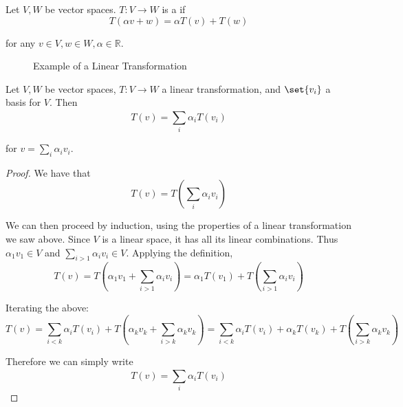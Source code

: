 \documentclass{article}
\begin{document}
\begin{definition}
  Let $V, W$ be vector spaces. $T: V \to W$ is a  if
  \[
    T(\alpha v + w) = \alpha T(v) + T(w)
  \]

  for any $v \in V, w \in W, \alpha \in \mathbb{R}$.
\end{definition}

\begin{figure}[!ht]
  \centering
  \caption{Example of a Linear Transformation}
  \label{fig:example_of_a_linear_transformation}
\end{figure}

\begin{theorem}
  Let $V, W$ be vector spaces, $T: V \to W$ a linear transformation, and $\set{v_i}$ a basis for $V$. Then
  \[
    T(v) = \sum^{}_{i} \alpha_i T(v_i)
  \]

  for $v = \sum^{}_{i} \alpha_i v_i$.
\end{theorem}

\begin{proof}
  We have that
  \[
    T(v) = T\left(\sum^{}_{i} \alpha_i v_i\right)
  \]

  We can then proceed by induction, using the properties of a linear transformation we saw above. Since $V$ is a linear space, it has all its  linear combinations. Thus $\alpha_1 v_1 \in V$ and $\sum^{}_{i > 1} \alpha_i v_i \in V$. Applying the definition,
  \[
    T(v)
    =
    T\left(\alpha_1 v_1 + \sum^{}_{i > 1} \alpha_i v_i\right)
    =
    \alpha_1 T\left(v_1\right) + T\left(\sum^{}_{i > 1} \alpha_i v_i\right)
  \]

  Iterating the above:
  \[
    T(v)
    =
    \sum^{}_{i < k}
    \alpha_i T\left(v_i\right)
    +
    T\left(\alpha_k v_k + \sum^{}_{i > k} \alpha_k v_k\right)
    =
    \sum^{}_{i < k}
    \alpha_i T\left(v_i\right)
    +
    \alpha_k T(v_k)
    +
    T\left(\sum^{}_{i > k} \alpha_k v_k\right)
  \]

  Therefore we can simply write
  \[
    T(v) = \sum^{}_{i} \alpha_i T\left(v_i\right)
  \]
\end{proof}
\end{document}
